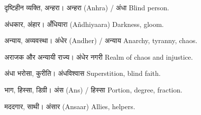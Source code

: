 %
{दृष्टिहीन व्यक्ति, अन्हरा।}%
{अन्हरा (Anhra) / अंधा}%
{Blind person.}

%
{अंधकार, अंहार।}%
{अँधियारा (Añdhiyaara)}%
{Darkness, gloom.}

%
{अन्याय, अव्यवस्था।}%
{अंधेर (Andher) / अन्याय}%
{Anarchy, tyranny, chaos.}

%
{अराजक और अन्यायी राज्य।}%
{अंधेर नगरी}%
{Realm of chaos and injustice.}

%
{अंधा भरोसा, कुरीति।}%
{अंधविश्वास}%
{Superstition, blind faith.}

%
{भाग, हिस्सा, डिग्री।}%
{अंस (Ans) / हिस्सा}%
{Portion, degree, fraction.}

%
{मददगार, साथी।}%
{अंसार (Ansaar)}%
{Allies, helpers.}
